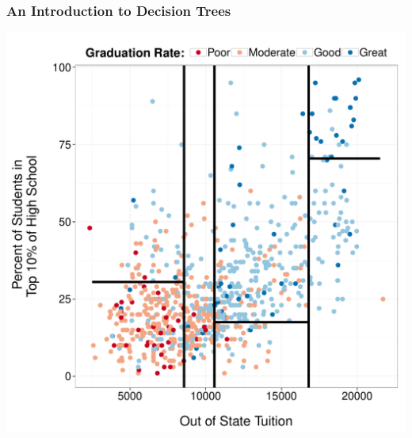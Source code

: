 \documentclass{beamer}\usepackage[]{graphicx}\usepackage[]{color}
\makeatletter
\def\maxwidth{ %
  \ifdim\Gin@nat@width>\linewidth
    \linewidth
  \else
    \Gin@nat@width
  \fi
}
\newenvironment{knitrout}{}{} %
\makeatother
\begin{document}
\begin{frame}
\frametitle{An Introduction to Decision Trees}

\begin{multicols}{2}

\begin{center}

\begin{knitrout}
\color{fgcolor}
\includegraphics[width=\maxwidth]{figure/grad_rate_rpart_splits-1} 

\end{knitrout}

\end{center}

\columnbreak

\begin{center}


\end{center}
\end{multicols}
\end{frame}
\end{document}
